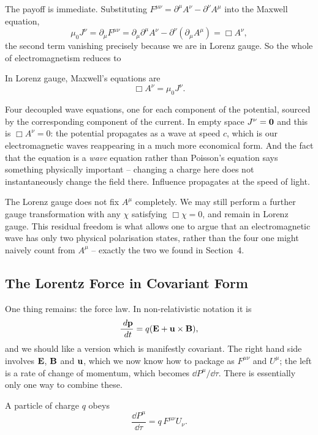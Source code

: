 \documentclass[a4paper]{scrartcl}
\begin{document}
The payoff is immediate. Substituting $F^{\mu\nu} = \partial^\mu A^\nu - \partial^\nu A^\mu$ into the Maxwell equation,
$$
\mu_0 J^\nu = \partial_\mu F^{\mu\nu} = \partial_\mu \partial^\mu A^\nu - \partial^\nu(\partial_\mu A^\mu) = \Box A^\nu,
$$
the second term vanishing precisely because we are in Lorenz gauge. So the whole of electromagnetism reduces to

\begin{theorem}
	In Lorenz gauge, Maxwell's equations are
	$$
	\Box A^\nu = \mu_0 J^\nu.
	$$
\end{theorem}

Four decoupled wave equations, one for each component of the potential, sourced by the corresponding component of the current. In empty space $J^\nu = \mathbf{0}$ and this is $\Box A^\nu = 0$: the potential propagates as a wave at speed $c$, which is our electromagnetic waves reappearing in a much more economical form. And the fact that the equation is a \emph{wave} equation rather than Poisson's equation says something physically important -- changing a charge here does not instantaneously change the field there. Influence propagates at the speed of light.

\begin{remark}
	The Lorenz gauge does not fix $A^\mu$ completely. We may still perform a further gauge transformation with any $\chi$ satisfying $\Box \chi = 0$, and remain in Lorenz gauge. This residual freedom is what allows one to argue that an electromagnetic wave has only two physical polarisation states, rather than the four one might naively count from $A^\mu$ -- exactly the two we found in Section~4.
\end{remark}

\subsection{The Lorentz Force in Covariant Form}

One thing remains: the force law. In non-relativistic notation it is
$$
\frac{\; d \mathbf{p}}{\; d t} = q(\mathbf{E}+\mathbf{u}\times\mathbf{B}),
$$
and we should like a version which is manifestly covariant. The right hand side involves $\mathbf{E}$, $\mathbf{B}$ and $\mathbf{u}$, which we now know how to package as $F^{\mu\nu}$ and $U^\mu$; the left is a rate of change of momentum, which becomes $\dd P^\mu/\dd\tau$. There is essentially only one way to combine these.

\begin{law}
	A particle of charge $q$ obeys
	$$
	\frac{\dd P^\mu}{\dd \tau} = q\, F^{\mu\nu}U_\nu.
	$$
\end{law}
\end{document}
